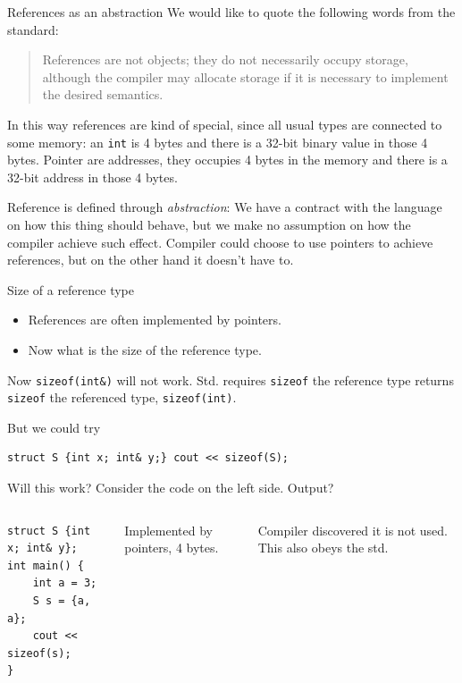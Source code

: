 \begin{frame}{References as an abstraction}
We would like to quote the following words from the standard:
\begin{quotation}
	References are not objects; they do not necessarily occupy storage, although the compiler may allocate storage if it is necessary to implement the desired semantics.
\end{quotation}
In this way references are kind of special, since all usual types are connected to some memory: an \texttt{int} is 4 bytes and there is a 32-bit binary value in those 4 bytes. Pointer are addresses, they occupies 4 bytes in the memory and there is a 32-bit address in those 4 bytes. 

Reference is defined through \textit{abstraction}: We have a contract with the language on how this thing should behave, but we make no assumption on how the compiler achieve such effect. Compiler could choose to use pointers to achieve references, but on the other hand it doesn't have to. 
\end{frame}

\begin{frame}[fragile]{Size of a reference type}
\begin{itemize}
	\item References are often implemented by pointers.
	\item Now what is the size of the reference type.
\end{itemize}
Now \texttt{sizeof(int\&)} will not work. Std. requires \texttt{sizeof} the reference type returns \texttt{sizeof} the referenced type, \texttt{sizeof(int)}.

But we could try
\begin{verbatim}
struct S {int x; int& y;} cout << sizeof(S);
\end{verbatim}
Will this work? Consider the code on the left side. Output?
\vspace{-0.15in}
\begin{columns}
\begin{verbatim}
struct S {int x; int& y};
int main() {
    int a = 3;
    S s = {a, a};
    cout << sizeof(s);
} 
\end{verbatim}
	
	
	Implemented by pointers, 4 bytes.
	
	
	Compiler discovered it is not used. This also obeys the std.
	
\end{columns}
\end{frame}


